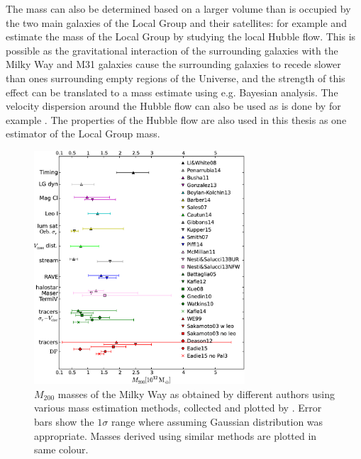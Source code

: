 \documentclass[english, twoside]{HYgradu}
\begin{document}

The mass can also be determined based on a larger volume than is occupied by the two main galaxies of the Local Group and their satellites: for example \citet{penarrubia2014dynamical} and \citet{fattahi2016apostle} estimate the mass of the Local Group by studying the local Hubble flow. This is possible as the gravitational interaction of the surrounding galaxies with the Milky Way and M31 galaxies cause the surrounding galaxies to recede slower than ones surrounding empty regions of the Universe, and the strength of this effect can be translated to a mass estimate using e.g. Bayesian analysis. The velocity dispersion around the Hubble flow can also be used as is done by for example \citet{gonzalez2014mass}. The properties of the Hubble flow are also used in this thesis as one estimator of the Local Group mass.

\begin{figure}
   \centering
   \includegraphics[width=0.7\textwidth]{kuvat/wang2015-masses.png}
   \caption{$M_{200}$ masses of the Milky Way as obtained by different authors using various mass estimation methods, collected and plotted by \citet{wang2015estimating}. Error bars show the $1\sigma$ range where assuming Gaussian distribution was appropriate. Masses derived using similar methods are plotted in same colour.}
   \label{fig:wang-masses}
\end{figure}
\end{document}

